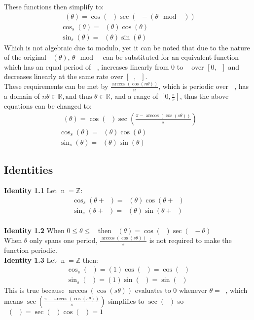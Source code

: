 \documentclass[11pt]{article}
\DeclareMathOperator{\custd}{\mathrm{d}_s}
\DeclareMathOperator{\custh}{\mathrm{h}_s}
\DeclareMathOperator{\custi}{\mathrm{n}}
\DeclareMathOperator{\period}{\frac{2\pi}{s}}
\DeclareMathOperator{\hp}{\frac{\pi}{s}}
\DeclareMathOperator{\iperiod}{\custi\frac{2\pi}{s}}
\begin{document}
These functions then simplify to:
\begin{gather*}
\custd(\theta)=\cos(\hp)\sec(\hp-(\theta\mod\period))\\
\cos_s(\theta)=\custd(\theta)\cos(\theta)\\
\sin_s(\theta)=\custd(\theta)\sin(\theta)
\end{gather*}
Which is not algebraic due to modulo, yet it can be noted that due to the nature of the original \(\custh(\theta)\), \(\theta\mod\period\) can be substituted for an equivalent function which has an equal period of \(\period\), increases linearly from 0 to \(\hp\) over \([0,\hp]\) and decreases linearly at the same rate over \([\hp,\period]\).\\
These requirements can be met by \(\frac{\arccos(\cos(n\theta))}{n}\), which is periodic over \(\period\), has a domain of \(n\theta\in\mathbb{R},\text{and thus } \theta\in\mathbb{R}\), and a range of \([0,\frac{\pi}{s}]\), thus the above equations can be changed to:
\begin{gather*}
\custd(\theta)=\cos(\hp)\sec(\frac{\pi-\arccos(\cos(s\theta))}{s})\\
\cos_s(\theta)=\custd(\theta)\cos(\theta)\\
\sin_s(\theta)=\custd(\theta)\sin(\theta)
\end{gather*}

\subsection{Identities}
\textbf{Identity 1.1} Let \(\custi=\mathbb{Z}\):
\begin{gather*}
\cos_s(\theta+\iperiod) = \custd(\theta)\cos(\theta+\iperiod)\\
\sin_s(\theta+\iperiod) = \custd(\theta)\sin(\theta+\iperiod)
\end{gather*} \\
\textbf{Identity 1.2} When \(0\leq\theta\leq\period\) then \(\custd(\theta)=\cos(\hp)\sec(\hp-\theta)\)\\
When \(\theta\) only spans one period, \(\frac{\arccos(\cos(s\theta))}{s}\) is not required to make the function periodic.\\
\textbf{Identity 1.3} Let \(\custi=\mathbb{Z}\) then:
\begin{gather*}
\cos_s(\iperiod) = (1)\cos(\iperiod)=\cos(\iperiod)\\
\sin_s(\iperiod) = (1)\sin(\iperiod)=\sin(\iperiod)
\end{gather*}
This is true because \(\arccos(\cos(s\theta))\) evaluates to 0 whenever \(\theta=\iperiod\), which means \(\sec(\frac{\pi-\arccos(\cos(s\theta))}{s})\) simplifies to \(\sec(\hp)\) so \(\custd(\iperiod)=\sec(\hp)\cos(\hp)=1\)
\end{document}
